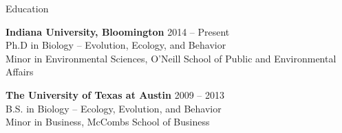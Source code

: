 \documentclass{resume} %
\begin{document}

\begin{rSection}{Education}

{\bf Indiana University, Bloomington} \hfill {2014 -- Present} \\
Ph.D in Biology -- Evolution, Ecology, and Behavior \\
Minor in Environmental Sciences, O'Neill School of Public and Environmental Affairs

{\bf The University of Texas at Austin} \hfill {2009 -- 2013} \\
B.S. in Biology -- Ecology, Evolution, and Behavior \\
Minor in Business, McCombs School of Business

\end{rSection}


% 
% 
% 
% 
% 

\bigskip

\end{document}
